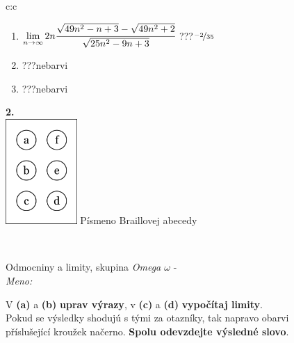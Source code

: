 \documentclass[10pt]{report}
\begin{document}
\begin{tabular}{c:c}
\begin{minipage}[c][104.5mm][t]{0.5\linewidth}
\begin{center}
\begin{minipage}{0.79\linewidth}
\begin{center}
\begin{varwidth}{\linewidth}
\begin{enumerate}
\item $\lim\limits_{n\to\infty}2n\cfrac{\sqrt{49n^2-n+3}-\sqrt{49n^2+2}}{\sqrt{25n^2-9n+3}}$\quad \dotfill\; ???\;\dotfill \quad $\nicefrac{-2}{35}$
\item \quad \dotfill\; ???\;\dotfill \quad nebarvi
\item \quad \dotfill\; ???\;\dotfill \quad nebarvi
\end{enumerate}
\end{varwidth}
\end{center}
\end{minipage}
\begin{minipage}{0.20\linewidth}
\begin{center}
{\Huge\bfseries 2.} \\[2mm]
\includegraphics[height=40mm]{../images/braille.png}
{\small Písmeno Braillovej abecedy}
\end{center}
\end{minipage}
\end{center}
\end{minipage}
\\ \hdashline
\begin{minipage}[c][104.5mm][t]{0.5\linewidth}
\begin{center}
\vspace{7mm}
{\huge Odmocniny a limity, skupina \textit{Omega $\omega$} -}\\[5mm]
\textit{Meno:}\phantom{xxxxxxxxxxxxxxxxxxxxxxxxxxxxxxxxxxxxxxxxxxxxxxxxxxxxxxxxxxxxxxxxx}\\[5mm]
\begin{minipage}{0.95\linewidth}
\begin{center}
V \textbf{(a)} a \textbf{(b)} \textbf{uprav výrazy}, v \textbf{(c)} a \textbf{(d)} \textbf{vypočítaj limity}.\\Pokud se výsledky shodujú s tými za otazníky, tak napravo obarvi\\příslušející kroužek načerno. \textbf{Spolu odevzdejte výsledné slovo}.
\end{center}
\end{minipage}
\\[1mm]

\end{center}
\end{minipage}
\end{tabular}
\end{document}
